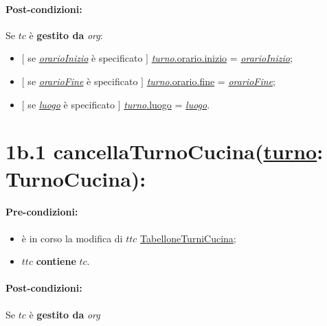 \paragraph{Post-condizioni:} Se $tc$ è \textbf{gestito da} \textit{org}:

\begin{itemize}
    \item $[$ se \underline{\textit{orarioInizio}} è specificato $]$ \underline{\textit{turno}.orario.inizio} = \underline{\textit{orarioInizio}};

    \item $[$ se \underline{\textit{orarioFine}} è specificato $]$ \underline{\textit{turno}.orario.fine} = \underline{\textit{orarioFine}};

    \item $[$ se \underline{\textit{luogo}} è specificato $]$ \underline{\textit{turno}.luogo} = \underline{\textit{luogo}}.

\end{itemize}

\section*{1b.1 cancellaTurnoCucina(\underline{turno}: TurnoCucina):}

\paragraph{Pre-condizioni:}

\begin{itemize}
 \item è in corso la modifica di $ttc$ \underline{TabelloneTurniCucina};
  \item $ttc$ \textbf{contiene} $tc$.
\end{itemize}

\paragraph{Post-condizioni:} Se $tc$ è \textbf{gestito da} {\textit{org}}

